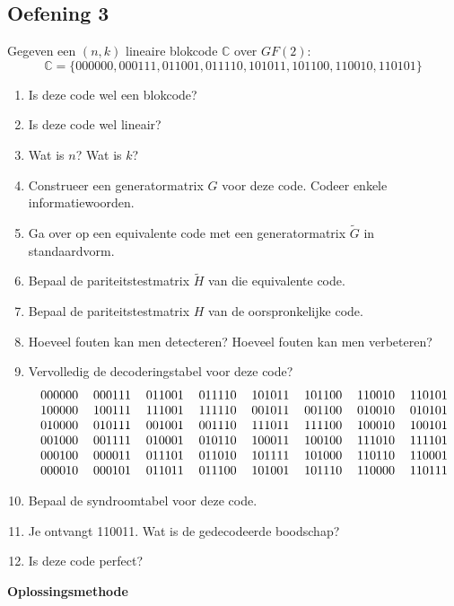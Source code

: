 \documentclass[11pt,a4paper,titlepage]{article}
\begin{document}
\subsection{Oefening 3}
	Gegeven een $(n, k)$ lineaire blokcode $\mathbb{C}$ over $GF(2)$:
		$$\mathbb{C} = \{000000, 000111, 011001, 011110, 101011, 101100, 110010, 110101\}$$
	\begin{enumerate}[label=(\alph*)]
	\item  Is deze code wel een blokcode?
	\item Is deze code wel lineair?
	\item Wat is $n$? Wat is $k$?
	\item Construeer een generatormatrix $G$ voor deze code. Codeer enkele informatiewoorden.
	\item Ga over op een equivalente code met een generatormatrix $\tilde{G}$ in standaardvorm.
	\item Bepaal de pariteitstestmatrix $\tilde{H}$ van die equivalente code.
	\item Bepaal de pariteitstestmatrix $H$ van de oorspronkelijke code.
	\item Hoeveel fouten kan men detecteren? Hoeveel fouten kan men verbeteren?
	\item Vervolledig de decoderingstabel voor deze code?
			$$\begin{tabular}{llllllll}
000000 & 000111 & 011001 & 011110 & 101011 & 101100 & 110010 & 110101 \\
100000 & 100111 & 111001 & 111110 & 001011 & 001100 & 010010 & 010101 \\
010000 & 010111 & 001001 & 001110 & 111011 & 111100 & 100010 & 100101 \\
001000 & 001111 & 010001 & 010110 & 100011 & 100100 & 111010 & 111101 \\
000100 & 000011 & 011101 & 011010 & 101111 & 101000 & 110110 & 110001 \\
000010 & 000101 & 011011 & 011100 & 101001 & 101110 & 110000 & 110111
\end{tabular}$$
	\item Bepaal de syndroomtabel voor deze code.
	\item Je ontvangt 110011. Wat is de gedecodeerde boodschap?
	\item Is deze code perfect?
\end{enumerate}
	 \textbf{Oplossingsmethode}
\end{document}
